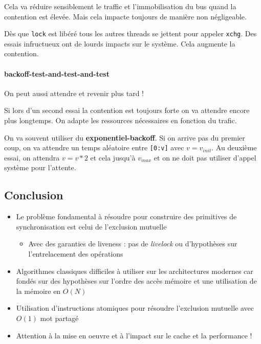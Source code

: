 Cela va réduire sensiblement le traffic et l'immobilisation du bus quand
la contention est élevée. Mais cela impacte toujours de manière non
négligeable.

Dès que \texttt{lock} est libéré tous les autres threads se jettent pour
appeler \texttt{xchg}. Des essais infructueux ont de lourds impacts sur
le système. Cela augmente la contention.

\paragraph{backoff-test-and-test-and-test}\label{backoff-test-and-test-and-test}

On peut aussi attendre et revenir plus tard !

Si lors d'un second essai la contention est toujours forte on va
attendre encore plus longtemps. On adapte les ressources nécessaires en
fonction du trafic.

On va souvent utiliser du \textbf{exponentiel-backoff}. Si on arrive pas
du premier coup, on va attendre un temps aléatoire entre
\texttt{{[}0:v{]}} avec \(v=v_{init}\). Au deuxième essai, on attendra
\(v=v*2\) et cela jusqu'à \(v_{max}\) et on ne doit pas utiliser d'appel
système pour l'attente.

\subsection{Conclusion}\label{conclusion}

\begin{itemize}
\tightlist
\item
  Le problème fondamental à résoudre pour construire des primitives de
  synchronisation est celui de l'exclusion mutuelle

  \begin{itemize}
  \tightlist
  \item
    Avec des garanties de liveness : pas de \emph{livelock} ou
    d'hypothèses sur l'entrelacement des opérations
  \end{itemize}
\item
  Algorithmes classiques difficiles à utiliser sur les architectures
  modernes car fondés sur des hypothèses sur l'ordre des accès mémoire
  et une utilisation de la mémoire en \(O(N)\)
\item
  Utilisation d'instructions atomiques pour résoudre l'exclusion
  mutuelle avec \(O(1)\) mot partagé
\item
  Attention à la mise en oeuvre et à l'impact sur le cache et la
  performance !
\end{itemize}
